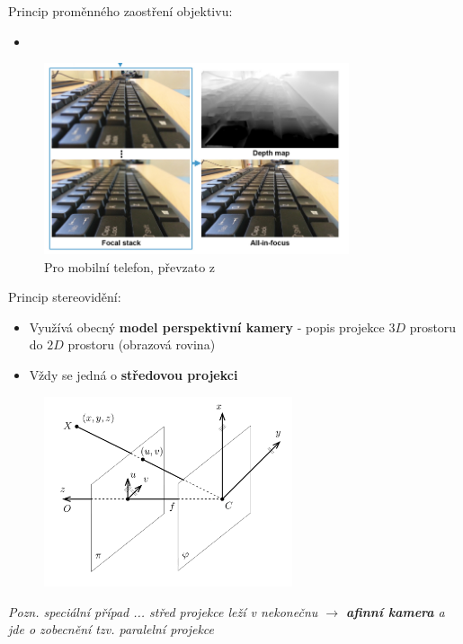 

\begin{frame}
Princip proměnného zaostření objektivu:
\begin{itemize}
\item 
\end{itemize}
	\begin{figure}[!ht]
	\centering
	\includegraphics[width = 0.8\textwidth]{./fokus}
	\caption{Pro mobilní telefon, převzato z \cite{Suwajanakorn_2015_CVPR}}
	\end{figure}
\end{frame}

 
\begin{frame}
Princip stereovidění:
\begin{itemize}
\item Využívá obecný \textbf{model perspektivní kamery} - popis projekce $ 3D $ prostoru do $ 2D $ prostoru (obrazová rovina)
\item Vždy se jedná o \textbf{středovou projekci}
\end{itemize}

\begin{figure}[h]
\centering
\includegraphics[width=0.65\textwidth]{./fig01}
\end{figure}
\textit{
Pozn.  speciální případ ... střed projekce leží v nekonečnu $ \rightarrow $ \textbf{afinní kamera} a jde o zobecnění tzv. paralelní projekce}
\end{frame}

